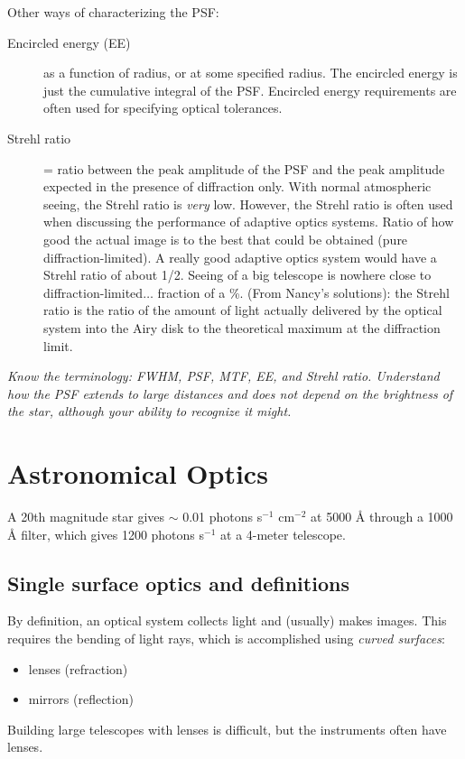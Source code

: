 \documentclass[12pt]{article}
\newcommand{\mynotes}[1]{\textcolor{myBlue}{#1}}
\newcommand{\test}[1]{%
    \begin{center}
        {\parbox{0.9\textwidth}{\textit{\small#1}}}
    \end{center}}
\begin{document}
Other ways of characterizing the PSF:
\begin{description}
    \item [Encircled energy (EE)] as a function of radius, or at some specified
        radius. The encircled energy is just the cumulative integral of the
        PSF\@. Encircled energy requirements are often used for specifying
        optical tolerances.
    \item [Strehl ratio] = ratio
        between the peak amplitude of the PSF and the peak amplitude expected
        in the presence of diffraction only. With normal atmospheric seeing,
        the Strehl ratio is \emph{very} low. However, the Strehl ratio is often
        used when discussing the performance of adaptive optics systems.
        \mynotes{Ratio of how good the actual image is to the best that could
        be obtained (pure diffraction-limited). A really good adaptive optics
        system would have a Strehl ratio of about 1/2. Seeing of a big
        telescope is nowhere close to diffraction-limited$\ldots$ fraction of a
        \%. (From Nancy's solutions): the Strehl ratio is the ratio of the
        amount of light actually delivered by the optical system into the Airy
        disk to the theoretical maximum at the diffraction limit.}
\end{description}

\test{Know the terminology: FWHM, PSF, MTF, EE, and Strehl ratio.
Understand how the PSF extends to large distances and does not depend on
the brightness of the star, although your ability to recognize it might.}

\newpage
\section{Astronomical Optics}
A 20th magnitude star gives $\sim$ 0.01 photons s$^{-1}$ cm$^{-2}$
at 5000 \AA{} through a 1000 \AA{} filter, which gives 1200
photons s$^{-1}$ at a 4-meter telescope.

\subsection{Single surface optics and definitions}
By definition, an optical system collects light and (usually) makes images.
This requires the bending of light rays, which is accomplished using
\textit{curved surfaces}:
\begin{itemize}
    \item lenses (refraction)
    \item mirrors (reflection)
\end{itemize}
Building large telescopes with lenses is difficult, but the
instruments often have lenses.
\end{document}
